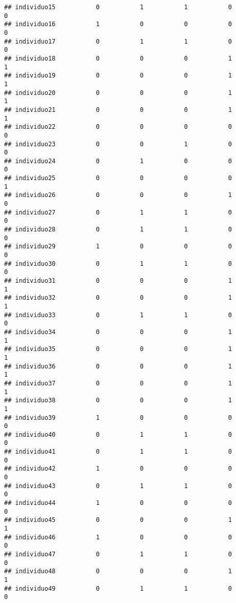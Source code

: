 \documentclass[
]{article}
\begin{document}
\begin{verbatim}
## individuo15           0           1           1           0           0
## individuo16           1           0           0           0           0
## individuo17           0           1           1           0           0
## individuo18           0           0           0           1           1
## individuo19           0           0           0           1           1
## individuo20           0           0           0           1           1
## individuo21           0           0           0           1           1
## individuo22           0           0           0           0           0
## individuo23           0           0           1           0           0
## individuo24           0           1           0           0           0
## individuo25           0           0           0           0           1
## individuo26           0           0           0           1           0
## individuo27           0           1           1           0           0
## individuo28           0           1           1           0           0
## individuo29           1           0           0           0           0
## individuo30           0           1           1           0           0
## individuo31           0           0           0           1           1
## individuo32           0           0           0           1           1
## individuo33           0           1           1           0           0
## individuo34           0           0           0           1           1
## individuo35           0           0           0           1           1
## individuo36           0           0           0           1           1
## individuo37           0           0           0           1           1
## individuo38           0           0           0           1           1
## individuo39           1           0           0           0           0
## individuo40           0           1           1           0           0
## individuo41           0           1           1           0           0
## individuo42           1           0           0           0           0
## individuo43           0           1           1           0           0
## individuo44           1           0           0           0           0
## individuo45           0           0           0           1           1
## individuo46           1           0           0           0           0
## individuo47           0           1           1           0           0
## individuo48           0           0           0           1           1
## individuo49           0           1           1           0           0

\end{verbatim}
\end{document}
